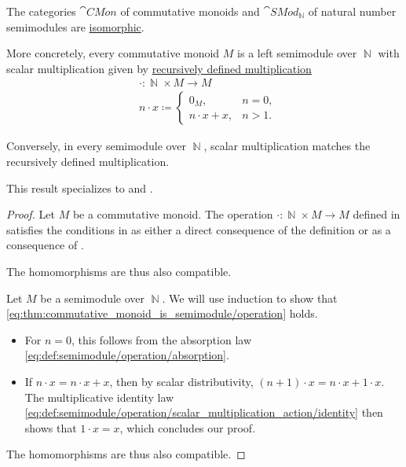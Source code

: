 \begin{proposition}\label{thm:commutative_monoid_is_semimodule}
  The categories \( \hyperref[def:monoid/category]{\cat{CMon}} \) of commutative monoids and \( \hyperref[def:semimodule/category]{\cat{SMod}_\BbbN} \) of natural number semimodules are \hyperref[rem:category_similarity/isomorphism]{isomorphic}.

  More concretely, every commutative monoid \( M \) is a left semimodule over \( \BbbN \) with scalar multiplication given by \hyperref[rem:additive_magma/multiplication]{recursively defined multiplication}
  \begin{equation}\label{eq:thm:commutative_monoid_is_semimodule/operation}
    \begin{aligned}
      &\cdot: \BbbN \times M \to M \\
      &n \cdot x \coloneqq \begin{cases}
        0_M,           &n = 0, \\
        n \cdot x + x, &n > 1.
      \end{cases}
    \end{aligned}
  \end{equation}

  Conversely, in every semimodule over \( \BbbN \), scalar multiplication matches the recursively defined multiplication.

  This result specializes to  and .
\end{proposition}
\begin{proof}
  \SufficiencySubProof Let \( M \) be a commutative monoid. The operation \( \cdot: \BbbN \times M \to M \) defined in  satisfies the conditions in  as either a direct consequence of the definition or as a consequence of .

  The homomorphisms are thus also compatible.

  \NecessitySubProof Let \( M \) be a semimodule over \( \BbbN \). We will use induction to show that \eqref{eq:thm:commutative_monoid_is_semimodule/operation} holds.
  \begin{itemize}
    \item For \( n = 0 \), this follows from the absorption law \eqref{eq:def:semimodule/operation/absorption}.
    \item If \( n \cdot x = n \cdot x + x \), then by scalar distributivity, \( (n + 1) \cdot x = n \cdot x + 1 \cdot x \). The multiplicative identity law \eqref{eq:def:semimodule/operation/scalar_multiplication_action/identity} then shows that \( 1 \cdot x = x \), which concludes our proof.
  \end{itemize}

  The homomorphisms are thus also compatible.
\end{proof}

